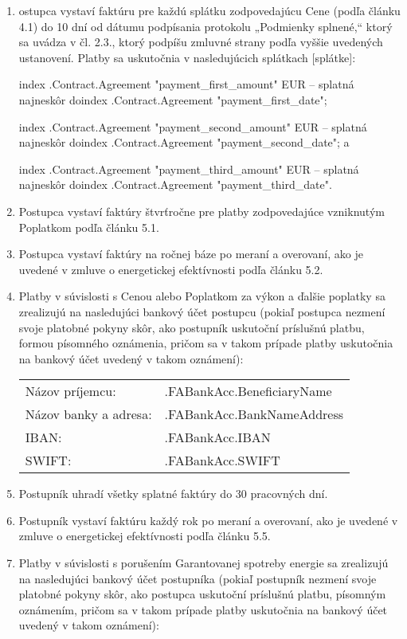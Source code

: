 \documentclass[a4paper]{article}
\begin{document}
\begin{enumerate}
\item{ostupca vystaví faktúru pre každú splátku zodpovedajúcu Cene (podľa článku 4.1) do 10 dní od dátumu podpísania protokolu „Podmienky splnené,“ ktorý sa uvádza v čl. 2.3., ktorý podpíšu zmluvné strany podľa vyššie uvedených ustanovení. Platby sa uskutočnia v nasledujúcich splátkach [splátke]:} \par

    {{index .Contract.Agreement "payment_first_amount"}} EUR – splatná najneskôr do{{index .Contract.Agreement "payment_first_date"}}; \par
    {{index .Contract.Agreement "payment_second_amount"}} EUR – splatná najneskôr do{{index .Contract.Agreement "payment_second_date"}}; a \par
    {{index .Contract.Agreement "payment_third_amount"}} EUR – splatná najneskôr do{{index .Contract.Agreement "payment_third_date"}}.\par



\item{Postupca vystaví faktúry štvrťročne pre platby zodpovedajúce vzniknutým Poplatkom podľa článku 5.1.}
\item{Postupca vystaví faktúry na ročnej báze po meraní a overovaní, ako je uvedené v zmluve o energetickej efektívnosti podľa článku 5.2.}

\item{Platby v súvislosti s Cenou alebo Poplatkom za výkon a ďalšie poplatky sa zrealizujú na nasledujúci bankový účet postupcu (pokiaľ postupca nezmení svoje platobné pokyny skôr, ako postupník uskutoční príslušnú platbu, formou písomného oznámenia, pričom sa v takom prípade platby uskutočnia na bankový účet uvedený v takom oznámení):}\par

    \begin{tabu}{XX[2]}
        Názov príjemcu: 	& 	{{.FABankAcc.BeneficiaryName}} 	\\
        Názov banky a adresa:  	& 	{{.FABankAcc.BankNameAddress}} 	\\
        IBAN:			& 	{{.FABankAcc.IBAN}} 		\\
        SWIFT:			& 	{{.FABankAcc.SWIFT}} 		\\
    \end{tabu}

    \item{Postupník uhradí všetky splatné faktúry do 30 pracovných dní.}
    \item{Postupník vystaví faktúru každý rok po meraní a overovaní, ako je uvedené v zmluve o energetickej efektívnosti podľa článku 5.5.}
    \item{Platby v súvislosti s porušením Garantovanej spotreby energie sa zrealizujú na nasledujúci bankový účet postupníka (pokiaľ postupník nezmení svoje platobné pokyny skôr, ako postupca uskutoční príslušnú platbu, písomným oznámením, pričom sa v takom prípade platby uskutočnia na bankový účet uvedený v takom oznámení):}
    


\end{enumerate}
\end{document}

